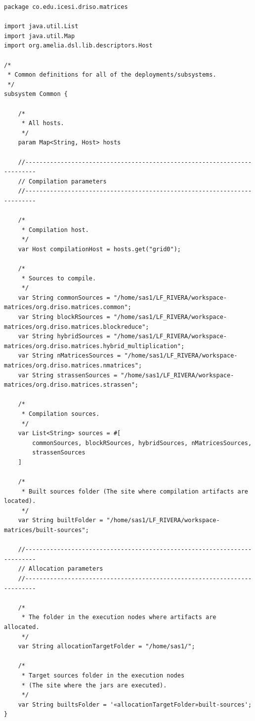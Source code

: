 \documentclass{article}
\newcommand\amelia[0]{\textsc{Amelia}}
\begin{document}



\begin{lstlisting}[style=amelia,caption=Subsystem Common]
package co.edu.icesi.driso.matrices

import java.util.List
import java.util.Map
import org.amelia.dsl.lib.descriptors.Host

/*
 * Common definitions for all of the deployments/subsystems.
 */
subsystem Common {

	/*
	 * All hosts.
	 */
	param Map<String, Host> hosts

	//-------------------------------------------------------------------------
	// Compilation parameters
	//-------------------------------------------------------------------------

	/*
	 * Compilation host.
	 */
	var Host compilationHost = hosts.get("grid0");

	/*
	 * Sources to compile.
	 */
	var String commonSources = "/home/sas1/LF_RIVERA/workspace-matrices/org.driso.matrices.common";
	var String blockRSources = "/home/sas1/LF_RIVERA/workspace-matrices/org.driso.matrices.blockreduce";
	var String hybridSources = "/home/sas1/LF_RIVERA/workspace-matrices/org.driso.matrices.hybrid_multiplication";
	var String nMatricesSources = "/home/sas1/LF_RIVERA/workspace-matrices/org.driso.matrices.nmatrices";
	var String strassenSources = "/home/sas1/LF_RIVERA/workspace-matrices/org.driso.matrices.strassen";

	/*
	 * Compilation sources.
	 */
	var List<String> sources = #[
        commonSources, blockRSources, hybridSources, nMatricesSources,
        strassenSources
	]

	/*
	 * Built sources folder (The site where compilation artifacts are located).
	 */
	var String builtFolder = "/home/sas1/LF_RIVERA/workspace-matrices/built-sources";

	//-------------------------------------------------------------------------
	// Allocation parameters
	//-------------------------------------------------------------------------

	/*
	 * The folder in the execution nodes where artifacts are allocated.
	 */
	var String allocationTargetFolder = "/home/sas1/";

	/*
	 * Target sources folder in the execution nodes
	 * (The site where the jars are executed).
	 */
	var String builtsFolder = '«allocationTargetFolder»built-sources';
}

\end{lstlisting}
\end{document}
